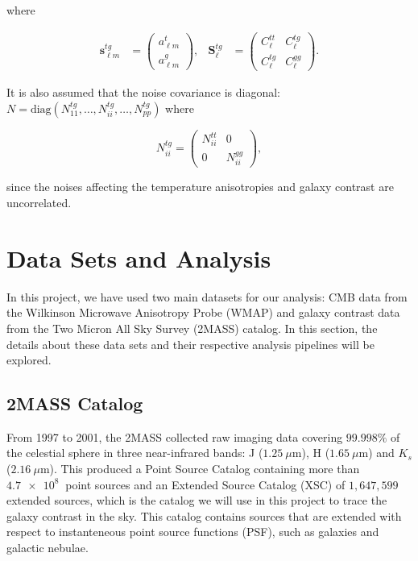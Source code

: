 \documentclass[openany,a4paper,12pt,oneside]{book}
\begin{document}
\begin{spacing}{1.5}
\noindent where 

\begin{align}\label{s_lm=}
	\mathbf{s}_{\ell m}^{tg}&=
	\begin{pmatrix}
	a_{\ell m}^t\\
	a_{\ell m}^g
	\end{pmatrix}, &
	\mathbf{S}_\ell^{tg}&=
	\begin{pmatrix}
	C_\ell^{tt} & C_\ell^{tg}\\
	C_\ell^{tg} & C_\ell^{gg}
	\end{pmatrix}.
\end{align}

It is also assumed that the noise covariance is diagonal: $N=\text{diag}(N_{11}^{tg}, \dots, N_{ii}^{tg}, \dots, N_{pp}^{tg})$ where

\begin{equation}\label{Niitg}
	N_{ii}^{tg}=
	\begin{pmatrix}
	N_{ii}^{tt} & 0 \\
	0 & N_{ii}^{gg}
	\end{pmatrix},
\end{equation}

\noindent since the noises affecting the temperature anisotropies and galaxy contrast are uncorrelated. 

\section{Data Sets and Analysis}

In this project, we have used two main datasets for our analysis: CMB data from the Wilkinson Microwave Anisotropy Probe (WMAP)\cite{WMAP_results,WMAP_data} and galaxy contrast data from the Two Micron All Sky Survey (2MASS) catalog\cite{2MASS}. In this section, the details about these data sets and their respective analysis pipelines will be explored.

\subsection{2MASS Catalog}

From 1997 to 2001, the 2MASS collected raw imaging data covering $99.998\%$ of the celestial sphere in three near-infrared bands: J ($\SI{1.25}{\mu \meter}$), H ($\SI{1.65}{\mu \meter}$) and $K_s$ ($\SI{2.16}{\mu \meter}$). This produced a Point Source Catalog containing more than $\SI{4.7e8}{}$ point sources and an Extended Source Catalog (XSC) of $1,647,599$ extended sources, which is the catalog we will use in this project to trace the galaxy contrast in the sky. This catalog contains sources that are extended with respect to instanteneous point source functions (PSF), such as galaxies and galactic nebulae.


\end{spacing}
\end{document}
